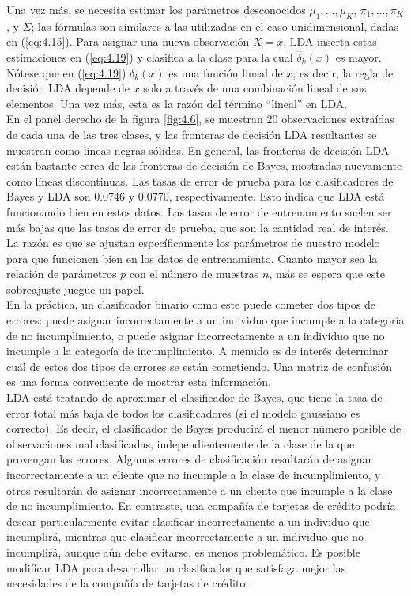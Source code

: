 Una vez más, se necesita estimar los parámetros desconocidos $\mu_1, \ldots, \mu_K$, $\pi_1, \ldots, \pi_K$, y $\Sigma$; las fórmulas son similares a las utilizadas en el caso unidimensional, dadas en (\ref{eq:4.15}). Para asignar una nueva observación $X = x$, LDA inserta estas estimaciones en (\ref{eq:4.19}) y clasifica a la clase para la cual $\hat{\delta}_k(x)$ es mayor. Nótese que en (\ref{eq:4.19}) $\delta_k(x)$ es una función lineal de $x$; es decir, la regla de decisión LDA depende de $x$ solo a través de una combinación lineal de sus elementos. Una vez más, esta es la razón del término ``lineal'' en LDA. \\

En el panel derecho de la figura \ref{fig:4.6}, se muestran 20 observaciones extraídas de cada una de las tres clases, y las fronteras de decisión LDA resultantes se muestran como líneas negras sólidas. En general, las fronteras de decisión LDA están bastante cerca de las fronteras de decisión de Bayes, mostradas nuevamente como líneas discontinuas. Las tasas de error de prueba para los clasificadores de Bayes y LDA son 0.0746 y 0.0770, respectivamente. Esto indica que LDA está funcionando bien en estos datos. Las tasas de error de entrenamiento suelen ser más bajas que las tasas de error de prueba, que son la cantidad real de interés. La razón es que se ajustan específicamente los parámetros de nuestro modelo para que funcionen bien en los datos de entrenamiento. Cuanto mayor sea la relación de parámetros $p$ con el número de muestras $n$, más se espera que este sobreajuste juegue un papel. \\

En la práctica, un clasificador binario como este puede cometer dos tipos de errores: puede asignar incorrectamente a un individuo que incumple a la categoría de no incumplimiento, o puede asignar incorrectamente a un individuo que no incumple a la categoría de incumplimiento. A menudo es de interés determinar cuál de estos dos tipos de errores se están cometiendo. Una matriz de confusión es una forma conveniente de mostrar esta información. \\

LDA está tratando de aproximar el clasificador de Bayes, que tiene la tasa de error total más baja de todos los clasificadores (si el modelo gaussiano es correcto). Es decir, el clasificador de Bayes producirá el menor número posible de observaciones mal clasificadas, independientemente de la clase de la que provengan los errores. Algunos errores de clasificación resultarán de asignar incorrectamente a un cliente que no incumple a la clase de incumplimiento, y otros resultarán de asignar incorrectamente a un cliente que incumple a la clase de no incumplimiento. En contraste, una compañía de tarjetas de crédito podría desear particularmente evitar clasificar incorrectamente a un individuo que incumplirá, mientras que clasificar incorrectamente a un individuo que no incumplirá, aunque aún debe evitarse, es menos problemático. Es posible modificar LDA para desarrollar un clasificador que satisfaga mejor las necesidades de la compañía de tarjetas de crédito. \\

